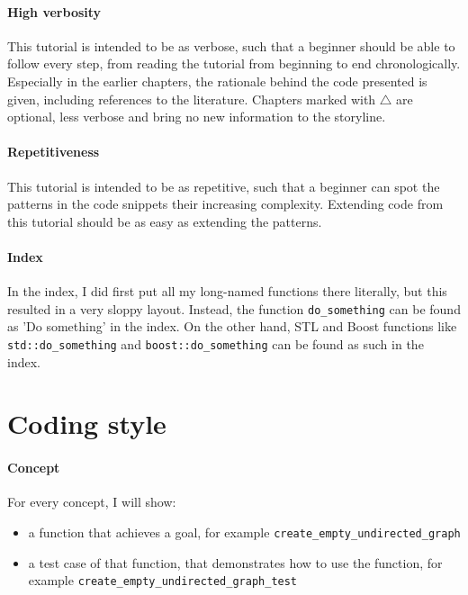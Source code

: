 \paragraph{High verbosity}

This tutorial is intended to be as verbose, 
such that a beginner should
be able to follow every step, 
from reading the tutorial from beginning
to end chronologically.
Especially in the earlier chapters, the rationale behind the code presented
is given, including references to the literature.
Chapters marked with $\triangle$ are optional, 
less verbose and bring no new information to the storyline.

\paragraph{Repetitiveness}

This tutorial is intended to be as repetitive, such that a beginner can
spot the patterns in the code snippets their increasing complexity.
Extending code from this tutorial should be as easy as extending the patterns.

\paragraph{Index}

In the index, I did first put all my long-named functions there literally,
but this resulted in a very sloppy layout.
Instead, the function \verb;do_something; can be found as 'Do something' in
the index.
On the other hand, STL and Boost functions like \verb;std::do_something; and
\verb;boost::do_something; can be found as such in the index.

\section{Coding style}

\paragraph{Concept}

For every concept, I will show:

\begin{itemize}
  \item a function that achieves a goal, 
    for example \verb;create_empty_undirected_graph;
  \item{
    a test case of that function, 
    that demonstrates how to use the function, for example
    \verb;create_empty_undirected_graph_test;
  }
\end{itemize}

